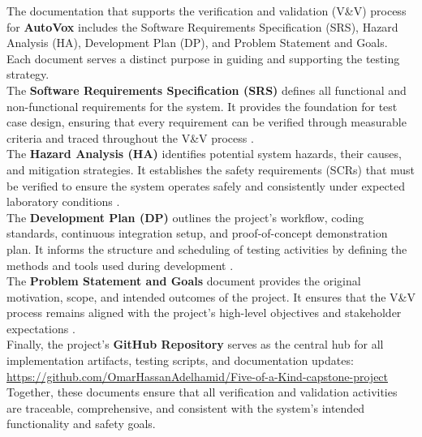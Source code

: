 \documentclass[12pt, titlepage]{article}
\begin{document}
\noindent The documentation that supports the verification and validation (V\&V) process for \textbf{AutoVox} includes the Software Requirements Specification (SRS), Hazard Analysis (HA), Development Plan (DP), and Problem Statement and Goals. Each document serves a distinct purpose in guiding and supporting the testing strategy.\\

\noindent The \textbf{Software Requirements Specification (SRS)} defines all functional and non-functional requirements for the system. It provides the foundation for test case design, ensuring that every requirement can be verified through measurable criteria and traced throughout the V\&V process \citet{SRS}.\\

\noindent The \textbf{Hazard Analysis (HA)} identifies potential system hazards, their causes, and mitigation strategies. It establishes the safety requirements (SCRs) that must be verified to ensure the system operates safely and consistently under expected laboratory conditions \citet{HA}.\\

\noindent The \textbf{Development Plan (DP)} outlines the project’s workflow, coding standards, continuous integration setup, and proof-of-concept demonstration plan. It informs the structure and scheduling of testing activities by defining the methods and tools used during development \citet{DP}.\\

\noindent The \textbf{Problem Statement and Goals} document provides the original motivation, scope, and intended outcomes of the project. It ensures that the V\&V process remains aligned with the project’s high-level objectives and stakeholder expectations \citet{PS}.\\

\noindent Finally, the project’s \textbf{GitHub Repository} serves as the central hub for all implementation artifacts, testing scripts, and documentation updates: \url{https://github.com/OmarHassanAdelhamid/Five-of-a-Kind-capstone-project}\\

\noindent Together, these documents ensure that all verification and validation activities are traceable, comprehensive, and consistent with the system’s intended functionality and safety goals.\\
\end{document}
